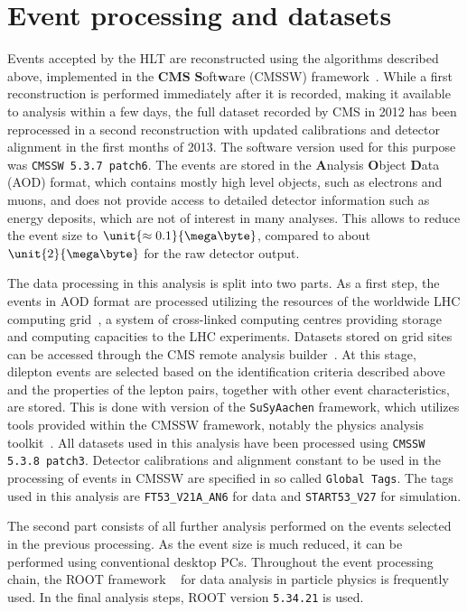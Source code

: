  
\section{Event processing and datasets}
Events accepted by the HLT are reconstructed using the algorithms described above, implemented in the $\textbf{CMS}$ $\textbf{S}$oft$\textbf{w}$are (CMSSW) framework~\cite{PTDR1,SWGuideCMSSW}. While a first reconstruction is performed immediately after it is recorded, making it available to analysis within a few days, the full dataset recorded by CMS in 2012 has been reprocessed in a second reconstruction with updated calibrations and detector alignment in the first months of 2013. The software version used for this purpose was \verb+CMSSW 5.3.7 patch6+. The events are stored in the $\textbf{A}$nalysis $\textbf{O}$bject $\textbf{D}$ata (AOD) format, which contains mostly high level objects, such as electrons and muons, and does not provide access to detailed detector information such as energy deposits, which are not of interest in many analyses. This allows to reduce the event size to $\unit{\approx0.1}{\mega\byte}$, compared to about $\unit{2}{\mega\byte}$ for the raw detector output. 

The data processing in this analysis is split into two parts. As a first step, the events in AOD format are processed utilizing the resources of the worldwide LHC computing grid~\cite{doi:10.1146/annurev-nucl-102010-130059,WLCG}, a system of cross-linked computing centres providing storage and computing capacities to the LHC experiments.  Datasets stored on grid sites can be accessed through the CMS remote analysis builder~\cite{CRAB}. At this stage, dilepton events are selected based on the identification criteria described above and the properties of the lepton pairs, together with other event characteristics, are stored. This is done with version  of the \verb+SuSyAachen+ framework, which utilizes tools provided within the CMSSW framework, notably the physics analysis toolkit~\cite{PATNote}. All datasets used in this analysis have been processed using \verb+CMSSW 5.3.8 patch3+. Detector calibrations and alignment constant to be used in the processing of events in CMSSW are specified in so called \verb+Global Tags+. The tags used in this analysis are \verb+FT53_V21A_AN6+ for data and \verb+START53_V27+ for simulation.

The second part consists of all further analysis performed on the events selected in the previous processing. As the event size is much reduced, it can be performed using conventional desktop PCs. Throughout the event processing chain, the ROOT framework ~\cite{ROOT} for data analysis in particle physics is frequently used. In the final analysis steps, ROOT version \verb+5.34.21+ is used.  

